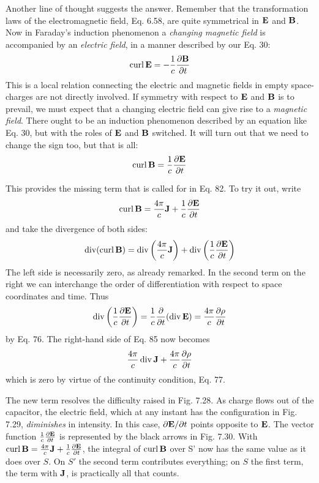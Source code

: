 Another line of thought suggests the answer. Remember that the
transformation laws of the electromagnetic field, Eq. 6.58, are quite
symmetrical in $\mathbf{E}$ and $\mathbf{B}$. Now in Faraday's induction phenomenon
a \emph{changing magnetic field} is accompanied by an \emph{electric field}, in a
manner described by our Eq. 30:
\begin{equation}
  \operatorname{curl}\mathbf{E} = -\frac{1}{c}\frac{\partial\mathbf{B}}{\partial t}
\end{equation}
This is a local relation connecting the electric and magnetic fields in
empty space-charges are not directly involved. If symmetry with
respect to $\mathbf{E}$ and $\mathbf{B}$ is to prevail, we must expect that a changing electric
field can give rise to a \emph{magnetic field}. There ought to be an induction
phenomenon described by an equation like Eq. 30, but with
the roles of $\mathbf{E}$ and $\mathbf{B}$ switched. It will turn out that we need to change
the sign too, but that is all:
\begin{equation}
  \operatorname{curl}\mathbf{B} = \frac{1}{c}\frac{\partial\mathbf{E}}{\partial t}
\end{equation}

This provides the missing term that is called for in Eq. 82. To
try it out, write
\begin{equation}
  \operatorname{curl}\mathbf{B} = \frac{4\pi}{c}\mathbf{J} + \frac{1}{c}\frac{\partial\mathbf{E}}{\partial t}
\end{equation}
and take the divergence of both sides:
\begin{equation}
  \operatorname{div}(\operatorname{curl}\mathbf{B}) = \operatorname{div}\left(\frac{4\pi}{c}\mathbf{J}\right) + 
            \operatorname{div}\left(\frac{1}{c}\frac{\partial\mathbf{E}}{\partial t}\right)
\end{equation}
The left side is necessarily zero, as already remarked. In the second
term on the right we can interchange the order of differentiation with
respect to space coordinates and time. Thus
\begin{equation}
  \operatorname{div}\left(\frac{1}{c}\frac{\partial\mathbf{E}}{\partial t}\right)
   = \frac{1}{c}\frac{\partial}{\partial t}(\operatorname{div}\mathbf{E})
   = \frac{4\pi}{c} \frac{\partial\rho}{\partial t}
\end{equation}
by Eq. 76. The right-hand side of Eq. 85 now becomes
\begin{equation}
  \frac{4\pi}{c}\operatorname{div}\mathbf{J}+\frac{4\pi}{c}\frac{\partial\rho}{\partial t}
\end{equation}
which is zero by virtue of the continuity condition, Eq. 77.

The new term resolves the difficulty raised in Fig. 7.28. As charge
flows out of the capacitor, the electric field, which at any instant has
the configuration in Fig. 7.29, \emph{diminishes} in intensity. In this case,
$\partial\mathbf{E}/\partial t$ points opposite to $\mathbf{E}$. 
The vector function $\frac{1}{c}\frac{\partial\mathbf{E}}{\partial t}$ is represented
by the black arrows in Fig. 7.30.
With $\operatorname{curl}\mathbf{B} = \frac{4\pi}{c}\mathbf{J} + \frac{1}{c}\frac{\partial\mathbf{E}}{\partial t}$, the
integral of $\operatorname{curl}\mathbf{B}$ over S' now has the same value as it does over $S$.
On $S'$ the second term contributes everything; on $S$ the first term, the
term with $\mathbf{J}$, is practically all that counts.

